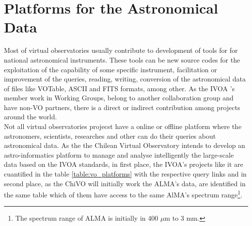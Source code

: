 \section{Platforms for the Astronomical Data}
Most of virtual observatories usually contribute to development of tools for for
national astronomical instruments. These tools can be new source codes for the
exploitation of the capability of some specific instrument, facilitation or
improvement of the queries, reading, writing, conversion of the astronomical
data of files like VOTable, ASCII and FITS formats, among other. As the IVOA 's
member work in Working Groups, belong to another collaboration group and have
non-VO partners, there is a direct or indirect contribution among projects
around the world.\\

Not all virtual observatories projecst have a online or offline platform where
the astronomers, scientists, researches and other can do their queries about
astronomical data. As the the Chilean Virtual Observatory intends to develop an
astro-informatics platform to manage and analyse intelligently the large-scale
data based on the IVOA standards, in first place, the IVOA's projects like it
are cuantified in the table \ref{table:vo_platforms} with the respective query
links and in second place, as the ChiVO will initially work the ALMA's data, are
identified in the same table which of them have access to the same AlMA's
spectrum range\footnote{The spectrum range of ALMA is initially in 400 $ \mu $m
to 3 mm.}.\\


